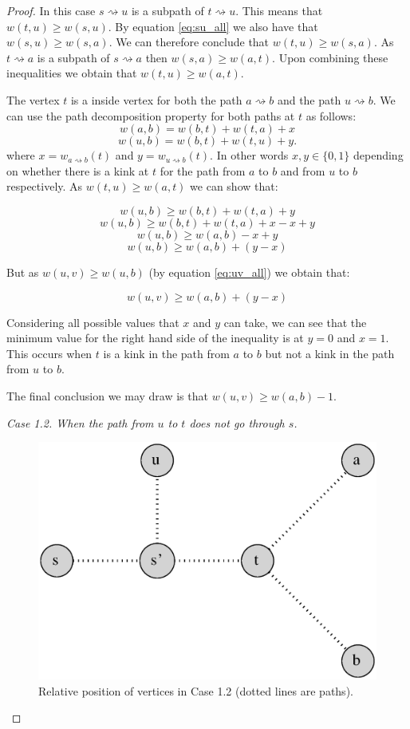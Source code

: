 \begin{proof}
In this case $s \rightsquigarrow u$ is a subpath of $t \rightsquigarrow u$. This means that $w(t, u) \ge w(s, u)$. By equation \ref{eq:su_all} we also have that $w(s, u) \ge w(s, a)$. We can therefore conclude that $w(t, u) \ge w(s, a)$. As $t \rightsquigarrow a$ is a subpath of $s \rightsquigarrow a$ then $w(s, a) \ge w(a, t)$. Upon combining these inequalities we obtain that $w(t, u) \ge w(a, t)$.


The vertex $t$ is a inside vertex for both the path $a \rightsquigarrow b$ and the path $u \rightsquigarrow b$. We can use the path decomposition property for both paths at $t$ as follows:
$$ w(a, b) = w(b, t) + w(t, a) + x  $$
$$ w(u, b) = w(b, t) + w(t, u) + y .$$
where $x = w_{a \rightsquigarrow b}(t)$ and $y = w_{u \rightsquigarrow b}(t)$. In other words $x, y \in \{0, 1\}$ depending on whether there is a kink at $t$ for the path from $a$ to $b$ and from $u$ to $b$ respectively. As $w(t, u) \ge w(a, t)$ we can show that:


$$ w(u, b) \ge w(b, t) + w(t, a) + y $$
$$ w(u, b) \ge w(b, t) + w(t, a) + x - x + y $$
$$ w(u, b) \ge w(a, b) - x + y $$
$$ w(u, b) \ge w(a, b) + (y - x) $$

But as $w(u, v) \ge w(u, b)$ (by equation \ref{eq:uv_all}) we obtain that:

$$ w(u, v) \ge w(a, b) + (y - x) $$

Considering all possible values that $x$ and $y$ can take, we can see that the minimum value for the right hand side of the inequality is at $y = 0$ and $x = 1$. This occurs when $t$ is a kink in the path from $a$ to $b$ but not a kink in the path from $u$ to $b$.

The final conclusion we may draw is that $w(u, v) \ge w(a, b) -1$.

{\em Case 1.2. When the path from $u$ to $t$ does not go through $s$.}

\begin{figure}[h]%
    \centering
    \includegraphics[center, scale=0.4 ]{./images/2xbfs-case-1-2.eps}
    \caption{Relative position of vertices in Case 1.2 (dotted lines are paths). }%
    \label{fig:case1.2}%
\end{figure}


\end{proof}
